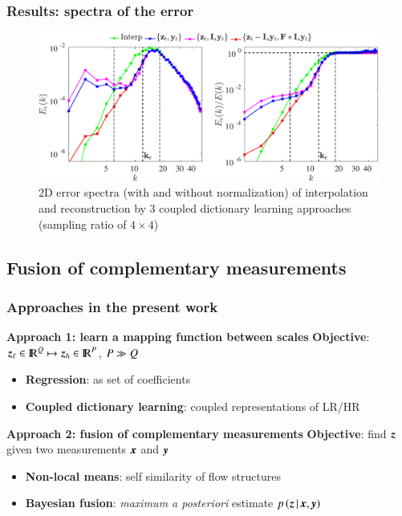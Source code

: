 \documentclass{beamer}
\let\olditem\item
\renewcommand{\item}{\setlength{\itemsep}{\fill}\olditem}
\begin{document}
\begin{frame}
	\frametitle{Results: spectra of the error} 

	\begin{figure}
		\centering
		\includegraphics[width=\textwidth]{./figures/DL/errspectra2d_nonnormalized_normalized_timespacing_06_spacespacing_04.eps}
		\caption*{2D error spectra (with and without normalization) of interpolation and reconstruction by 3 coupled dictionary learning approaches (sampling ratio of $ 4 \times 4 $)}
	\end{figure}
\end{frame}

\subsection{Fusion of complementary measurements}		
\begin{frame}
\frametitle{Approaches in the present work}	
	\begin{block}{\textbf{\color{black!20} Approach 1: learn a mapping function between scales}}
	\color{black!20} \textbf{Objective}: $ \operatorname{\boldsymbol{z}}_\ell \in {\rm I\!R}^Q \mapsto  \operatorname{\boldsymbol{z}}_h \in {\rm I\!R}^P $, $ P \gg Q$ 
		\begin{itemize}
			\item {\color{black!20} \textbf{\color{red!20} Regression}: as set of coefficients}\\
			\item {\color{black!20} \textbf{\color{red!20} Coupled dictionary learning}: coupled representations of LR/HR }\\
		\end{itemize}
	\end{block}
	\vfill
	\begin{block}{\textbf{Approach 2: fusion of complementary measurements}}
	\textbf{Objective}: find $ \operatorname{\boldsymbol{z}}$ given two measurements $ \operatorname{\boldsymbol{x}}$ and $ \operatorname{\boldsymbol{y}}$
		\begin{itemize}
			\item \textbf{\color{red} Non-local means}: self similarity of flow structures\\
			\item \textbf{\color{red} Bayesian fusion}: \textit{maximum a posteriori} estimate $p \left(\operatorname{\boldsymbol{z}}|\operatorname{\boldsymbol{x}},\operatorname{\boldsymbol{y}}\right)$	
		\end{itemize}
	\end{block}	
\end{frame}
\end{document}
